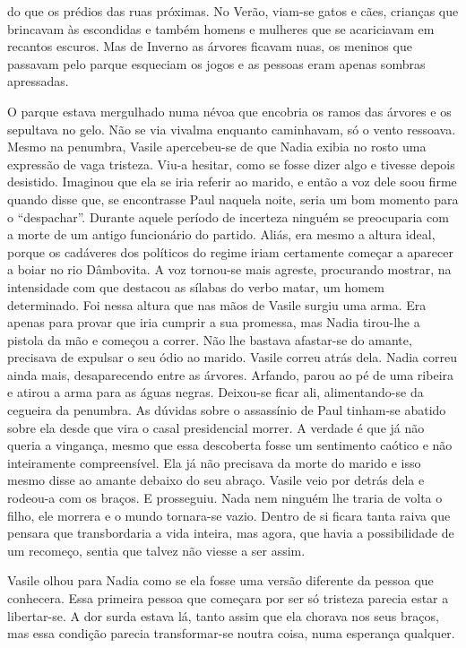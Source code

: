 do que os prédios das ruas próximas. No Verão, viam-se gatos e cães,
crianças que brincavam às escondidas e também homens e mulheres que se
acariciavam em recantos escuros. Mas de Inverno as árvores ficavam nuas,
os meninos que passavam pelo parque esqueciam os jogos e as pessoas eram apenas
sombras apressadas.

O parque estava mergulhado numa névoa que encobria os ramos das árvores
e os sepultava no gelo. Não se via vivalma enquanto caminhavam, só o
vento ressoava. Mesmo na penumbra, Vasile apercebeu-se de que Nadia
exibia no rosto uma expressão de vaga tristeza. Viu-a hesitar, como se
fosse dizer algo e tivesse depois desistido. Imaginou que ela se iria
referir ao marido, e então a voz dele soou firme quando disse que, se
encontrasse Paul naquela noite, seria um bom momento para o ``despachar''. Durante aquele período de incerteza ninguém se preocuparia com a
morte de um antigo funcionário do partido. Aliás, era mesmo a altura
ideal, porque os cadáveres dos políticos do regime iriam certamente
começar a aparecer a boiar no rio Dâmbovita. A voz tornou-se mais
agreste, procurando mostrar, na intensidade com que destacou as
sílabas do verbo matar, um homem determinado. Foi nessa altura que nas
mãos de Vasile surgiu uma arma. Era apenas para provar que iria cumprir
a sua promessa, mas Nadia tirou-lhe a pistola da mão e começou a
correr. Não lhe bastava afastar-se do amante, precisava de expulsar o
seu ódio ao marido. Vasile correu atrás dela. Nadia correu ainda mais,
desaparecendo entre as árvores. Arfando, parou ao pé de uma ribeira e
atirou a arma para as águas negras. Deixou-se ficar ali, alimentando-se
da cegueira da penumbra. As dúvidas sobre o assassínio de Paul tinham-se
abatido sobre ela desde que vira o casal presidencial morrer. A verdade
é que já não queria a vingança, mesmo que essa descoberta fosse um
sentimento
caótico e não inteiramente compreensível. Ela já não precisava da
morte do marido e isso mesmo disse ao amante debaixo do seu abraço.
Vasile veio por detrás dela e rodeou-a com os braços. E prosseguiu. Nada
nem ninguém lhe traria de volta o filho, ele morrera e o mundo tornara-se vazio. Dentro de si ficara tanta raiva que pensara que transbordaria
a vida inteira, mas agora, que havia a possibilidade de um recomeço,
sentia que talvez não viesse a ser assim.

Vasile olhou para Nadia como se ela fosse uma versão diferente da pessoa
que conhecera. Essa primeira pessoa que começara por ser só tristeza
parecia estar a libertar-se. A dor surda estava lá, tanto assim que ela
chorava nos seus braços, mas essa condição parecia transformar-se noutra
coisa, numa esperança qualquer.

